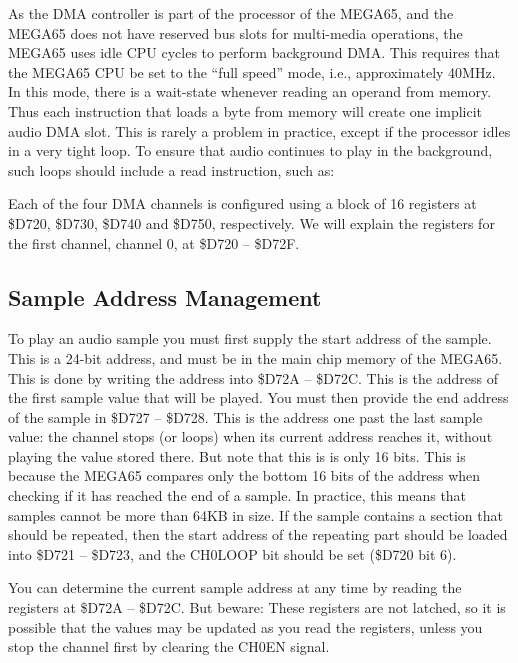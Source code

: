 As the DMA controller is part of the processor of the MEGA65, and the MEGA65 does not have reserved bus slots
for multi-media operations, the MEGA65 uses idle CPU cycles to perform background DMA. This requires that the
MEGA65 CPU be set to the ``full speed'' mode, i.e., approximately 40MHz.  In this mode, there is a wait-state
whenever reading an operand from memory.  Thus each instruction that loads a byte from memory will create one
implicit audio DMA slot.  This is rarely a problem in practice, except if the processor idles in a very tight
loop.  To ensure that audio continues to play in the background, such loops should include a read instruction,
such as:


Each of the four DMA channels is configured using a block of 16
registers at \$D720, \$D730, \$D740 and \$D750, respectively.
We will explain the registers for the first channel, channel 0, at
\$D720 -- \$D72F.

\subsection{Sample Address Management}

To play an audio sample you must first supply the start address of the
sample. This is a 24-bit address, and must be in the main chip memory
of the MEGA65. This is done by writing the address into \$D72A --
\$D72C.  This is the address of the first sample value that will be played.
You must then provide the end address of the sample in \$D727 --
\$D728. This is the address one past the last sample value: the channel
stops (or loops) when its current address reaches it, without playing
the value stored there.  But note that this is is only 16 bits. This is because the
MEGA65 compares only the bottom 16 bits of the address when checking
if it has reached the end of a sample.  In practice, this means that
samples cannot be more than 64KB in size.  If the sample contains a
section that should be repeated, then the start address of the
repeating part should be loaded into \$D721 -- \$D723, and the CH0LOOP
bit should be set (\$D720 bit 6).

You can determine the current sample address at any time by reading
the registers at \$D72A -- \$D72C. But beware: These registers are not
latched, so it is possible that the values may be updated as you read
the registers, unless you stop the channel first by clearing the CH0EN
signal.

